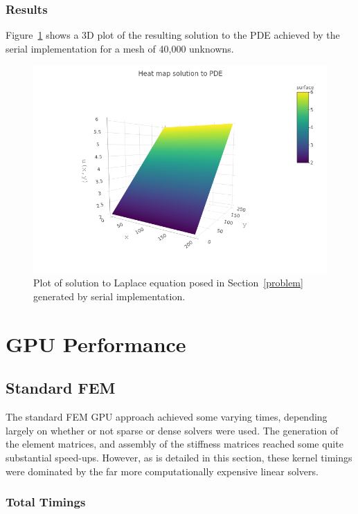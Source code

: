 \subsubsection{Results}

Figure~\ref{fig:results} shows a 3D plot of the resulting solution to the PDE achieved by the serial implementation for a mesh of 40,000 unknowns.

\begin{figure}
	\centering
	\includegraphics[width = 0.8\linewidth]{Plots/3d_soln}
	\caption{Plot of solution to Laplace equation posed in Section~\ref{problem} generated by serial implementation.}
	\label{fig:results}
\end{figure}
\section{GPU Performance}

\subsection{Standard FEM}

The standard FEM GPU approach achieved some varying times, depending largely on whether or not sparse or dense solvers were used. The generation of the element matrices, and assembly of the stiffness matrices reached some quite substantial speed-ups. However, as is detailed in this section, these kernel timings were dominated by the far more computationally expensive linear solvers.

\subsubsection{Total Timings}

